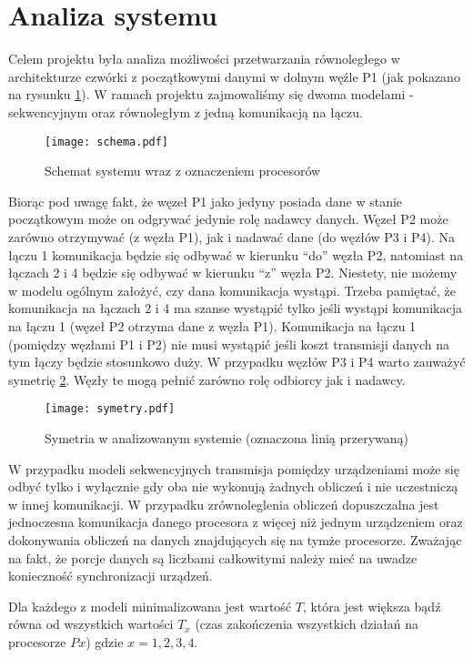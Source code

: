 
\section{Analiza systemu}

Celem projektu była analiza możliwości przetwarzania równoległego w architekturze czwórki z początkowymi danymi w dolnym węźle P1 (jak pokazano na rysunku \ref{fig:schema}).
W ramach projektu zajmowaliśmy się dwoma modelami - sekwencyjnym oraz równoległym z jedną komunikacją na łączu.

\begin{figure}[!ht]
\centering
\texttt{[image: schema.pdf]}
\caption{Schemat systemu wraz z oznaczeniem procesorów}
\label{fig:schema}
\end{figure}

Biorąc pod uwagę fakt, że węzeł P1 jako jedyny  posiada dane w stanie początkowym może on odgrywać jedynie rolę nadawcy danych. Węzeł P2 może zarówno otrzymywać (z węzła P1), jak i nadawać dane (do węzłów P3 i P4). Na łączu 1 komunikacja będzie się odbywać w kierunku “do” węzła P2, natomiast na łączach 2 i 4 będzie się odbywać w kierunku “z” węzła P2. Niestety, nie możemy w modelu ogólnym założyć, czy dana komunikacja wystąpi. Trzeba pamiętać, że komunikacja na łączach 2 i 4 ma szanse wystąpić tylko jeśli wystąpi komunikacja na łączu 1 (węzeł P2 otrzyma dane z węzła P1). Komunikacja na łączu 1 (pomiędzy węzłami P1 i P2) nie musi wystąpić jeśli koszt transmisji danych na tym łączy będzie stosunkowo duży. W przypadku węzłów P3 i P4 warto zauważyć symetrię \ref{fig:symetry}. Węzły te mogą pełnić zarówno rolę odbiorcy jak i nadawcy.

\begin{figure}[!ht]
\centering
\texttt{[image: symetry.pdf]}
\caption{Symetria w analizowanym systemie (oznaczona linią przerywaną)}
\label{fig:symetry}
\end{figure}

W przypadku modeli sekwencyjnych transmisja pomiędzy urządzeniami może się odbyć tylko i wyłącznie gdy oba nie wykonują żadnych obliczeń i nie uczestniczą w innej komunikacji. W przypadku zrównoleglenia obliczeń dopuszczalna jest jednoczesna komunikacja danego procesora z więcej niż jednym urządzeniem oraz dokonywania obliczeń na danych znajdujących się na tymże procesorze. Zważając na fakt, że porcje danych są liczbami całkowitymi należy mieć na uwadze konieczność synchronizacji urządzeń.

Dla każdego z modeli minimalizowana jest wartość $T$, która jest większa bądź równa od wszystkich wartości $T_x$ (czas zakończenia wszystkich działań na procesorze $Px$) gdzie $x = 1, 2, 3, 4$.
 
